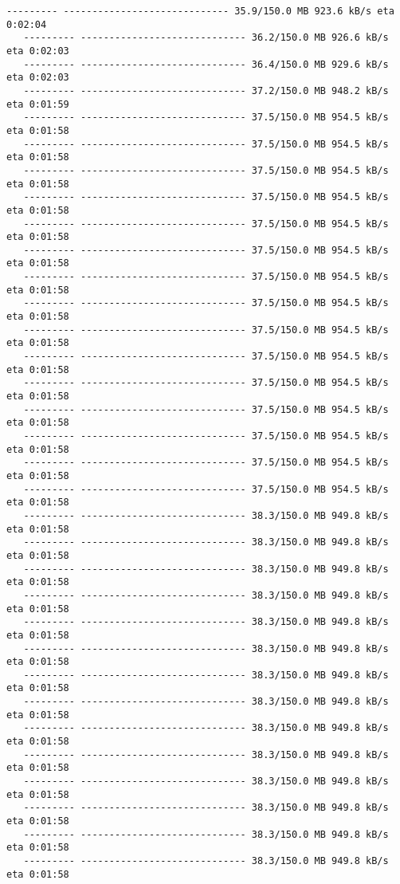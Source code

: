 \documentclass[11pt]{article}
\begin{document}
\begin{Verbatim}[commandchars=\\\{\}]
   --------- ----------------------------- 35.9/150.0 MB 923.6 kB/s eta 0:02:04
   --------- ----------------------------- 36.2/150.0 MB 926.6 kB/s eta 0:02:03
   --------- ----------------------------- 36.4/150.0 MB 929.6 kB/s eta 0:02:03
   --------- ----------------------------- 37.2/150.0 MB 948.2 kB/s eta 0:01:59
   --------- ----------------------------- 37.5/150.0 MB 954.5 kB/s eta 0:01:58
   --------- ----------------------------- 37.5/150.0 MB 954.5 kB/s eta 0:01:58
   --------- ----------------------------- 37.5/150.0 MB 954.5 kB/s eta 0:01:58
   --------- ----------------------------- 37.5/150.0 MB 954.5 kB/s eta 0:01:58
   --------- ----------------------------- 37.5/150.0 MB 954.5 kB/s eta 0:01:58
   --------- ----------------------------- 37.5/150.0 MB 954.5 kB/s eta 0:01:58
   --------- ----------------------------- 37.5/150.0 MB 954.5 kB/s eta 0:01:58
   --------- ----------------------------- 37.5/150.0 MB 954.5 kB/s eta 0:01:58
   --------- ----------------------------- 37.5/150.0 MB 954.5 kB/s eta 0:01:58
   --------- ----------------------------- 37.5/150.0 MB 954.5 kB/s eta 0:01:58
   --------- ----------------------------- 37.5/150.0 MB 954.5 kB/s eta 0:01:58
   --------- ----------------------------- 37.5/150.0 MB 954.5 kB/s eta 0:01:58
   --------- ----------------------------- 37.5/150.0 MB 954.5 kB/s eta 0:01:58
   --------- ----------------------------- 37.5/150.0 MB 954.5 kB/s eta 0:01:58
   --------- ----------------------------- 37.5/150.0 MB 954.5 kB/s eta 0:01:58
   --------- ----------------------------- 38.3/150.0 MB 949.8 kB/s eta 0:01:58
   --------- ----------------------------- 38.3/150.0 MB 949.8 kB/s eta 0:01:58
   --------- ----------------------------- 38.3/150.0 MB 949.8 kB/s eta 0:01:58
   --------- ----------------------------- 38.3/150.0 MB 949.8 kB/s eta 0:01:58
   --------- ----------------------------- 38.3/150.0 MB 949.8 kB/s eta 0:01:58
   --------- ----------------------------- 38.3/150.0 MB 949.8 kB/s eta 0:01:58
   --------- ----------------------------- 38.3/150.0 MB 949.8 kB/s eta 0:01:58
   --------- ----------------------------- 38.3/150.0 MB 949.8 kB/s eta 0:01:58
   --------- ----------------------------- 38.3/150.0 MB 949.8 kB/s eta 0:01:58
   --------- ----------------------------- 38.3/150.0 MB 949.8 kB/s eta 0:01:58
   --------- ----------------------------- 38.3/150.0 MB 949.8 kB/s eta 0:01:58
   --------- ----------------------------- 38.3/150.0 MB 949.8 kB/s eta 0:01:58
   --------- ----------------------------- 38.3/150.0 MB 949.8 kB/s eta 0:01:58
   --------- ----------------------------- 38.3/150.0 MB 949.8 kB/s eta 0:01:58

\end{Verbatim}
\end{document}
